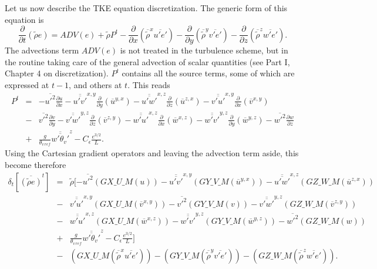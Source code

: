 Let us now describe the TKE equation discretization. The generic form
of this equation is
\begin{equation}
\frac{\partial}{\partial t}(\tilde{\rho} e)=
ADV(e) +\tilde{\rho} P^t
-\frac{\partial}{\partial x}(\overline{\tilde{\rho}}^x\overline{u'e'})
-\frac{\partial}{\partial y}(\overline{\tilde{\rho}}^y\overline{v'e'})
-\frac{\partial}{\partial z}(\overline{\tilde{\rho}}^z\overline{w'e'}).
\end{equation}
The advections term $ADV(e)$ is not treated in the turbulence scheme, but
in the routine taking care of the general advection of scalar quantities
(see Part I, Chapter 4 on discretization).  $P^t$ contains all the source terms, some of which are
expressed at $t-1$, and others at $t$. This reads
\begin{eqnarray}
P^t&=&
 -\overline{u'^2}\frac{\partial u}{\partial x}
-\overline{\overline{u'v'}}^{x,y}\frac{\partial}{\partial y}(\overline{u}^{y,x})
-\overline{\overline{u'w'}}^{x,z}\frac{\partial}{\partial z}(\overline{u}^{z,x})
-\overline{\overline{v'u'}}^{x,y}\frac{\partial}{\partial x}(\overline{v}^{x,y})
\nonumber \\
&-&\overline{v'^2}\frac{\partial v}{\partial y}
-\overline{\overline{v'w'}}^{y,z}\frac{\partial}{\partial z}(\overline{v}^{z,y})
-\overline{\overline{w'u'}}^{x,z}\frac{\partial}{\partial x}(\overline{w}^{x,z})
-\overline{\overline{w'v'}}^{y,z}\frac{\partial}{\partial y}(\overline{w}^{y,z})
-\overline{w'^2}\frac{\partial w}{\partial z}  \nonumber \\
&+&\frac{g}{\theta_{v\, ref}}\overline{\overline{w'\theta_v'}}^z
-C_{\epsilon}\frac{e^{3/2}}{L}.
\label{discect}
\end{eqnarray}
Using the Cartesian gradient operators and leaving the advection term aside,
this become therefore
\begin{eqnarray}
\delta_t \left [ \overline{(\tilde{\rho} e)}^t \right ]&=&
\tilde{\rho}[-\overline{u'^2}(GX\_U\_M( u) )
-\overline{\overline{u'v'}}^{x,y}(GY\_V\_M( \overline{u}^{y,x}))
-\overline{\overline{u'w'}}^{x,z}(GZ\_W\_M( \overline{u}^{z,x})) \nonumber \\
&-&\overline{\overline{v'u'}}^{x,y}(GX\_U\_M(\overline{v}^{x,y}))
-\overline{v'^2}(GY\_V\_M( v) )
-\overline{\overline{v'w'}}^{y,z}(GZ\_W\_M( \overline{v}^{z,y})) \nonumber \\
&-&\overline{\overline{w'u'}}^{x,z}(GX\_U\_M(\overline{w}^{x,z}))
-\overline{\overline{w'v'}}^{y,z}(GY\_V\_M( \overline{w}^{y,z}))
-\overline{w'^2}(GZ\_W\_M( w)) \nonumber \\
&+&\frac{g}{\theta_{v\, ref}}\overline{\overline{w'\theta_v'}}^z
-C_{\epsilon}\frac{e^{3/2}}{L}] \nonumber \\
&-&(GX\_U\_M(\overline{\tilde{\rho}}^x\overline{u'e'}))
-(GY\_V\_M(\overline{\tilde{\rho}}^y\overline{v'e'}))
-(GZ\_W\_M(\overline{\tilde{\rho}}^z\overline{w'e'})).
\end{eqnarray}

